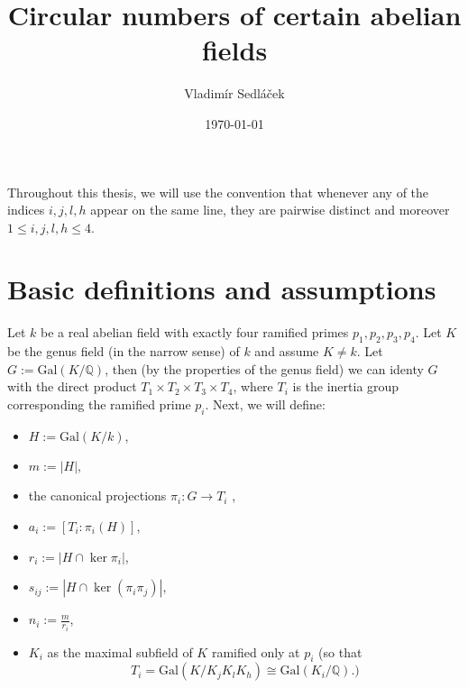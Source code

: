 \documentclass[12pt,a4paper]{article}
\newcommand{\Q}{\mathbb{Q}}
\newcommand{\Gal}{\mathrm{Gal}}
\begin{document}
\addtolength{\topmargin}{-30 pt}                   %
\setlength{\headsep}{10 pt}                      %
\renewcommand{\headrulewidth}{1 pt}                %

\title{Circular numbers of certain abelian fields}
\author{Vladimír Sedláček}
\date{\today}
\maketitle

Throughout this thesis, we will use the convention that whenever any of the indices $i,j,l,h$ appear on the same line, they are pairwise distinct and moreover $1\leq i,j,l,h\leq 4$.

\section{Basic definitions and assumptions}
Let $k$ be a real abelian field with exactly four ramified primes $p_1,p_2,p_3,p_4$. Let $K$ be the genus field (in the narrow sense) of $k$ and assume $K\neq k$. Let $G:=\Gal(K/\Q)$, then (by the properties of the genus field) we can identy $G$ with the direct product $T_1\times T_2\times T_3\times T_4$, where $T_i$ is the inertia group corresponding the ramified prime $p_i$. Next, we will define:

\begin{itemize}
\item $H:=\Gal(K/k)$, 
\item $m:=|H|,$
\item the canonical projections $\pi_i:G\to T_i$ ,
\item $a_i:=[T_i:\pi_i(H)]$,
\item $r_i:=|H\cap \ker \pi_i|$,
\item $s_{ij}:=|H\cap \ker (\pi_i\pi_j)|$,
\item $n_i:=\frac{m}{r_i}$,
\item $K_i$ as the maximal subfield of $K$ ramified only at $p_i$ (so that $$T_i=\Gal(K/K_jK_lK_h)\cong \Gal(K_i/\Q).)$$
\end{itemize}
\end{document}
